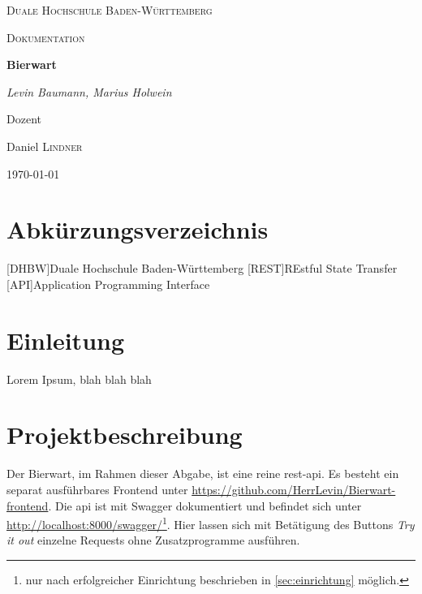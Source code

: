 \documentclass[12pt,a4paper,titlepage,ngerman,pdftex]{report}
\begin{document}
\begin{titlepage}
	\centering
	{\scshape\LARGE Duale Hochschule Baden-Württemberg \par}
	\vspace{1cm}
	{\scshape\Large Dokumentation\par}
	\vspace{1.5cm}
	{\huge\bfseries Bierwart\par}
	\vspace{2cm}
	{\Large\itshape Levin Baumann, Marius Holwein\par}
	\vfill
	Dozent\par
	Daniel \textsc{Lindner}

	\vfill

	{\large \today\par}
\end{titlepage}

\tableofcontents
\listoffigures

\chapter*{Abkürzungsverzeichnis}
\begin{acronym}[all]
	[DHBW]{Duale Hochschule Baden-Württemberg}
	[REST]{REstful State Transfer}
	[API]{Application Programming Interface}
\end{acronym}
\onehalfspacing


\chapter{Einleitung}\label{einleitung}
Lorem Ipsum, blah blah blah

\chapter{Projektbeschreibung}
Der Bierwart, im Rahmen dieser Abgabe, ist eine reine \ac{rest}-\ac{api}. Es besteht ein separat ausführbares Frontend unter \url{https://github.com/HerrLevin/Bierwart-frontend}.
Die \ac{api} ist mit Swagger dokumentiert und befindet sich unter \url{http://localhost:8000/swagger/}\footnote{nur nach erfolgreicher Einrichtung beschrieben in \ref{sec:einrichtung} möglich.}.
Hier lassen sich mit Betätigung des Buttons \textit{Try it out} einzelne Requests ohne Zusatzprogramme ausführen.
\end{document}
